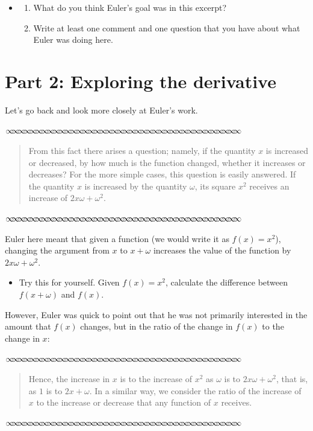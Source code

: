 \documentclass[11pt]{article}
\newcommand{\sep}{\vspace{-3pt}
\begin{center}
{\mathversion{normal}
$\infty \mspace{-5.5mu}\infty \mspace{-5.5mu}\infty \mspace{-5.5mu}\infty \mspace{-5.5mu}
\infty \mspace{-5.5mu}\infty \mspace{-5.5mu}\infty \mspace{-5.5mu}\infty \mspace{-5.5mu}
\infty \mspace{-5.5mu}\infty \mspace{-5.5mu}\infty \mspace{-5.5mu}\infty \mspace{-5.5mu}
\infty \mspace{-5.5mu}\infty \mspace{-5.5mu}\infty \mspace{-5.5mu}\infty \mspace{-5.5mu}
\infty \mspace{-5.5mu}\infty \mspace{-5.5mu}\infty \mspace{-5.5mu}\infty \mspace{-5.5mu}
\infty \mspace{-5.5mu}\infty \mspace{-5.5mu}\infty \mspace{-5.5mu}\infty \mspace{-5.5mu}
\infty \mspace{-5.5mu}\infty \mspace{-5.5mu}\infty \mspace{-5.5mu}\infty \mspace{-5.5mu}
\infty \mspace{-5.5mu}\infty \mspace{-5.5mu}\infty \mspace{-5.5mu}\infty \mspace{-5.5mu}
\infty \mspace{-5.5mu}\infty \mspace{-5.5mu}\infty \mspace{-5.5mu}\infty \mspace{-5.5mu}
\infty \mspace{-5.5mu}\infty \mspace{-5.5mu}\infty \mspace{-5.5mu}\infty \mspace{-5.5mu}$}
\end{center} \vspace*{-5pt}}
\newenvironment{source}%
 {\bigskip \sep \vspace*{-6pt} \begin{quote}
          \begin{sf}   }
   {   \end{sf}     \end{quote} \vspace*{-6pt} \sep \bigskip}%
\newcounter{tasknumb}
\newcommand{\tasknumb}{\stepcounter{tasknumb}\textmd{\textbf{$\fbox{$\fbox{Task \thetasknumb}$}$}}}
\newenvironment{task}%
 {\begin{itemize}
 \item[\tasknumb]  }
{
    \end{itemize}    }%
\begin{document}
\begin{task}
\begin{enumerate}
\item[(a)] What do you think Euler's goal was in  this excerpt?
\item[(b)] Write at least one comment and one question that you have about what Euler was doing here.
\end{enumerate}
\end{task}



\bigskip

\section*{Part 2: Exploring the derivative}

Let's go back and look more closely at Euler's work.


\begin{source}
\vspace*{-6pt}
From this fact there arises a question; namely, if the quantity $x$ is increased or decreased, by how much is the function changed, whether it increases or decreases?  For the more simple cases, this question is easily answered.  If the quantity $x$ is increased by the quantity $\omega$, its square $x^2$ receives an increase of $2x\omega + \omega^2$.
\vspace*{-8pt}
\end{source}


Euler here meant that given a function (we would write it as $f(x) = x^2$), changing the argument from $x$ to $x + \omega$ increases the value of the function by  $2x\omega + \omega^2$.

\bigskip

\begin{task} \label{increment} Try this for yourself.  Given $f(x) = x^2$, calculate the difference between $f(x + \omega)$ and  $ f(x)$.
\end{task}


However, Euler was quick to point out that he was not primarily interested in the amount that $f(x)$ changes, but in the ratio of the change in $f(x)$ to the change in $x$:




\begin{source}
\vspace*{-6pt}
Hence, the increase in $x$ is to the increase of $x^2$ as $\omega$ is to $2x\omega + \omega^2$, that is, as $1$ is to $2x + \omega$.  In a similar way, we consider the ratio of the increase of $x$ to the increase or decrease that any function of $x$ receives.
\vspace*{-8pt}
\end{source}
\end{document}
